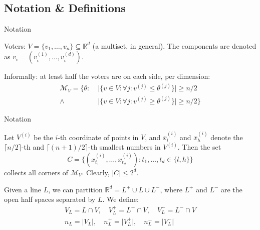 \documentclass{beamer}
\newcommand{\RR}{\mathbb{R}}
\newcommand{\dotleq}{\mathrel{\dot{\leq}}}
\newcommand{\eqspacing}[2]{%
  \setlength\abovedisplayskip{#1}%
  \setlength\belowdisplayskip{#2}%
}
\begin{document}
\subsection{Notation \& Definitions}
\begin{frame}{Notation}
  \begin{definition}[Voters]
    Voters: \(V = \{v_1, \dotsc, v_n\} \subseteq \RR^d \) (a multiset, in general). The components
    are denoted as \(v_i = (v^{(1)}_i, \dotsc, v^{(d)}_i)\).
  \end{definition}
  \begin{definition}
    \eqspacing{0pt}{0pt}
    Informally: at least half the voters are on each side, per dimension:
    \begin{align*}
      \mathcal{M}_V = \{ \theta :\; &\lvert\{v \in V : \forall j: v^{(j)} \leq \theta^{(j)}\}\rvert \geq n/2 \\
                           \wedge\; &\lvert\{v \in V : \forall j: v^{(j)} \geq \theta^{(j)}\}\rvert \geq n/2 \}
    \end{align*}
  \end{definition}
\end{frame}


\begin{frame}{Notation}
  \begin{definition}
    \eqspacing{0pt}{0pt}
    Let \(V^{(i)}\) be the \(i\)-th coordinate of points in \(V\), and \(x^{(i)}_l\) and
    \(x^{(i)}_h\) denote the \(\lceil n/2 \rceil\)-th and \(\lceil (n+1)/2 \rceil\)-th smallest
    numbers in \(V^{(i)}\). Then the set
    \begin{equation*}
      C = \{(x^{(i)}_{t_1}, \dotsc, x^{(i)}_{t_d}) : t_1, \dotsc, t_d \in \{l, h\}\}
    \end{equation*}
    collects all corners of \(\mathcal{M}_V\). Clearly, \(\lvert C\rvert \leq 2^d\). 
  \end{definition}
  \begin{definition}
    \eqspacing{1ex}{0pt}
    Given a line \(L\), we can partition \(\RR^d = L^+ \cup L \cup L^-\), where \(L^+\) and \(L^-\)
    are the open half spaces separated by \(L\). We define:
    \begin{gather*}
      V_L = L \cap V, \quad V^+_L = L^+ \cap V, \quad V^-_L = L^- \cap V \\
      n_L = \lvert V_L \rvert, \quad n^+_L = \lvert V^+_L \rvert, \quad n^-_L = \lvert V^-_L \rvert
    \end{gather*}
  \end{definition}
\end{frame}
\end{document}
